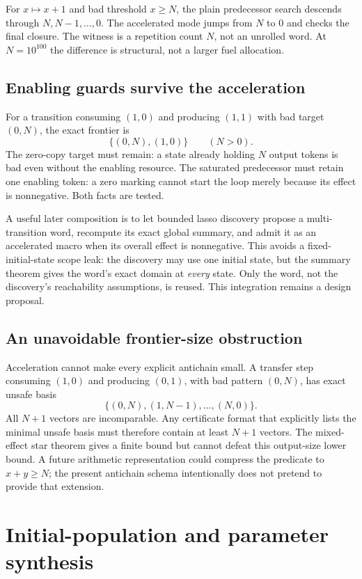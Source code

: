 \documentclass[11pt,a4paper]{article}
\theoremstyle{definition}
\theoremstyle{remark}
\begin{document}
For $x\mapsto x+1$ and bad threshold $x\ge N$, the plain predecessor search descends through $N,N-1,\ldots,0$. The accelerated mode jumps from $N$ to $0$ and checks the final closure. The witness is a repetition count $N$, not an unrolled word. At $N=10^{100}$ the difference is structural, not a larger fuel allocation.

\subsection{Enabling guards survive the acceleration}
For a transition consuming $(1,0)$ and producing $(1,1)$ with bad target $(0,N)$, the exact frontier is
\[
 \{(0,N),(1,0)\}\qquad(N>0).
\]
The zero-copy target must remain: a state already holding $N$ output tokens is bad even without the enabling resource. The saturated predecessor must retain one enabling token: a zero marking cannot start the loop merely because its effect is nonnegative. Both facts are tested.

A useful later composition is to let bounded lasso discovery propose a multi-transition word, recompute its exact global summary, and admit it as an accelerated macro when its overall effect is nonnegative. This avoids a fixed-initial-state scope leak: the discovery may use one initial state, but the summary theorem gives the word's exact domain at \emph{every} state. Only the word, not the discovery's reachability assumptions, is reused. This integration remains a design proposal.

\subsection{An unavoidable frontier-size obstruction}
Acceleration cannot make every explicit antichain small. A transfer step consuming $(1,0)$ and producing $(0,1)$, with bad pattern $(0,N)$, has exact unsafe basis
\[
 \{(0,N),(1,N-1),\ldots,(N,0)\}.
\]
All $N+1$ vectors are incomparable. Any certificate format that explicitly lists the minimal unsafe basis must therefore contain at least $N+1$ vectors. The mixed-effect star theorem gives a finite bound but cannot defeat this output-size lower bound. A future arithmetic representation could compress the predicate to $x+y\ge N$; the present antichain schema intentionally does not pretend to provide that extension.

\section{Initial-population and parameter synthesis}\label{sec:parameters}
\end{document}
